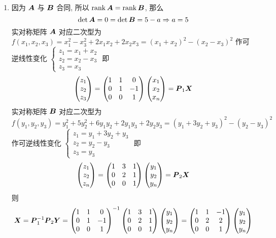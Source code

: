 \begin{solution}
    \begin{enumerate}[label=(\arabic{*})]
        \item 因为 $\vb*{A}$ 与 $\vb*{B}$ 合同, 所以 $\rank\vb*{A}=\rank\vb*{B}$, 那么
              $$\det\vb*{A}=0=\det\vb*{B}=5-a\Rightarrow a=5$$
              实对称矩阵 $\vb*{A}$ 对应二次型为 $f(x_1,x_2,x_3)=x_1^2-x_3^2+2x_1x_2+2x_2x_3=(x_1+x_2)^2-(x_2-x_3)^2$
              作可逆线性变化 $\begin{cases}
                      z_1=x_1+x_2 \\ z_2=x_2-x_3\\ z_3=x_3
                  \end{cases}$ 即 $$\mqty( z_1 \\ z_2 \\ z_3 )=\begin{pmatrix} 1 & 1 & 0 \\ 0 & 1 & -1 \\ 0 & 0 & 1 \\\end{pmatrix}\mqty( x_1 \\ x_2 \\ x_n )=\vb*{P}_1\vb*{X}$$
              实对称矩阵 $\vb*{B}$ 对应二次型为 $f(y_1, y_2, y_3)=y_1^2+5y_2^2+6y_1y_2+2y_1y_3+2y_2y_3=(y_1+3y_2+y_3)^2-(y_2-y_3)^2$ 作可逆线性变化 $\begin{cases}
                      z_1=y_1+3y_2+y_3 \\ z_2=y_2-y_3\\ z_3=y_3
                  \end{cases}$
              即
              $$
                  \mqty( z_1 \\ z_2 \\ z_n )=\begin{pmatrix} 1 & 3 & 1 \\ 0 & 2 & 1 \\ 0 & 0 & 1 \\\end{pmatrix}\mqty( y_1 \\ y_2 \\ y_n )=\vb*{P}_2\vb*{X}
              $$
              则 $$\vb*{X}=\vb*{P}_1^{-1}\vb*{P}_2\vb*{Y}=\begin{pmatrix} 1 & 1 & 0 \\ 0 & 1 & -1 \\ 0 & 0 & 1 \\\end{pmatrix}^{-1}\begin{pmatrix} 1 & 3 & 1 \\ 0 & 2 & 1 \\ 0 & 0 & 1 \\\end{pmatrix}\mqty( y_1 \\ y_2 \\ y_n )=\begin{pmatrix} 1 & 1 & -1 \\ 0 & 2 & 2 \\ 0 & 0 & 1 \\\end{pmatrix}\mqty( y_1 \\ y_2 \\ y_n )$$

\end{enumerate}
\end{solution}
